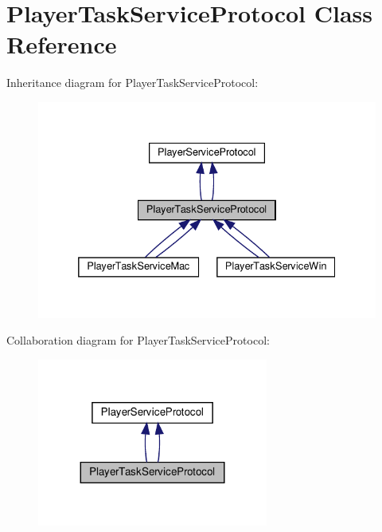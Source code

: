 \hypertarget{classPlayerTaskServiceProtocol}{}\section{Player\+Task\+Service\+Protocol Class Reference}
\label{classPlayerTaskServiceProtocol}


Inheritance diagram for Player\+Task\+Service\+Protocol\+:
\nopagebreak
\begin{figure}[H]
\begin{center}
\leavevmode
\includegraphics[width=332pt]{classPlayerTaskServiceProtocol__inherit__graph}
\end{center}
\end{figure}


Collaboration diagram for Player\+Task\+Service\+Protocol\+:
\nopagebreak
\begin{figure}[H]
\begin{center}
\leavevmode
\includegraphics[width=215pt]{classPlayerTaskServiceProtocol__coll__graph}
\end{center}
\end{figure}

